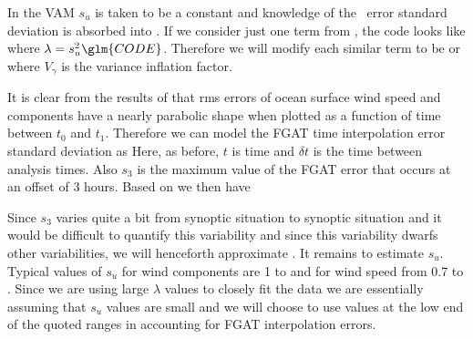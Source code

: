 \documentclass[12pt,titlepage]{article}
\begin{document}
In the VAM $s_u$ is taken to be a constant  and
knowledge of the \obs\ error standard deviation is absorbed into
.
If we consider just one term from , the 
code looks like
where $\lambda = s_u^2 \glm{CODE}$.
Therefore we will modify each similar term to be
or
where $V_{\gamma}$ is the variance inflation factor.

It is clear from the results of  that rms errors of ocean
surface wind speed and components have a nearly parabolic shape when
plotted as a function of time between $t_0$ and $t_1$.
Therefore we can model the FGAT time interpolation error standard
deviation as
Here, as before, $t$ is time and $\delta t$ is the time between
analysis times.
Also $s_3$ is the maximum value of the FGAT error that occurs at an
offset of 3 hours.
Based on  we then have

Since $s_3$ varies quite a bit from synoptic situation to synoptic
situation and it would be difficult to quantify this variability and
since this variability dwarfs other variabilities, we will henceforth
approximate .
It remains to estimate $s_u$.
Typical values of $s_u$ for wind components are 1 to  and for
wind speed from 0.7 to .
Since we are using large $\lambda$ values to closely fit the data we
are essentially assuming that $s_u$ values are small and we will
choose to use values at the low end of the quoted ranges in accounting
for FGAT interpolation errors.





\newcommand{\fitem}[3]{\item\label{fig:#1}\begin{minipage}[t]{6in}
 {\slshape {#2}} %
 \\ \medskip \\ \centerline{{\sffamily\upshape\bfseries {#3}}}\end{minipage}}
\end{document}
